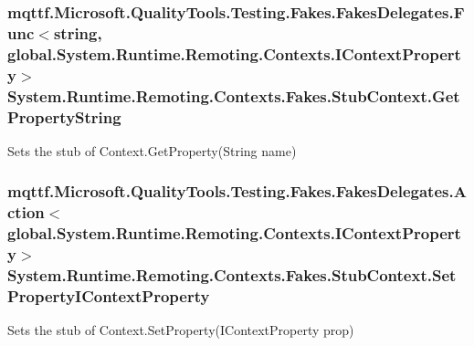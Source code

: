 \hypertarget{class_system_1_1_runtime_1_1_remoting_1_1_contexts_1_1_fakes_1_1_stub_context_a1ec7098f1e8505b46754adfd58df16ec}{
\subsubsection[{Get\-Property\-String}]{\setlength{\rightskip}{0pt plus 5cm}mqttf.\-Microsoft.\-Quality\-Tools.\-Testing.\-Fakes.\-Fakes\-Delegates.\-Func$<$string, global.\-System.\-Runtime.\-Remoting.\-Contexts.\-I\-Context\-Property$>$ System.\-Runtime.\-Remoting.\-Contexts.\-Fakes.\-Stub\-Context.\-Get\-Property\-String}}\label{class_system_1_1_runtime_1_1_remoting_1_1_contexts_1_1_fakes_1_1_stub_context_a1ec7098f1e8505b46754adfd58df16ec}


Sets the stub of Context.\-Get\-Property(\-String name)

\hypertarget{class_system_1_1_runtime_1_1_remoting_1_1_contexts_1_1_fakes_1_1_stub_context_ae6ffcad633a10fa61f96ae4c2e6c1aa9}{
\subsubsection[{Set\-Property\-I\-Context\-Property}]{\setlength{\rightskip}{0pt plus 5cm}mqttf.\-Microsoft.\-Quality\-Tools.\-Testing.\-Fakes.\-Fakes\-Delegates.\-Action$<$global.\-System.\-Runtime.\-Remoting.\-Contexts.\-I\-Context\-Property$>$ System.\-Runtime.\-Remoting.\-Contexts.\-Fakes.\-Stub\-Context.\-Set\-Property\-I\-Context\-Property}}\label{class_system_1_1_runtime_1_1_remoting_1_1_contexts_1_1_fakes_1_1_stub_context_ae6ffcad633a10fa61f96ae4c2e6c1aa9}


Sets the stub of Context.\-Set\-Property(\-I\-Context\-Property prop)

